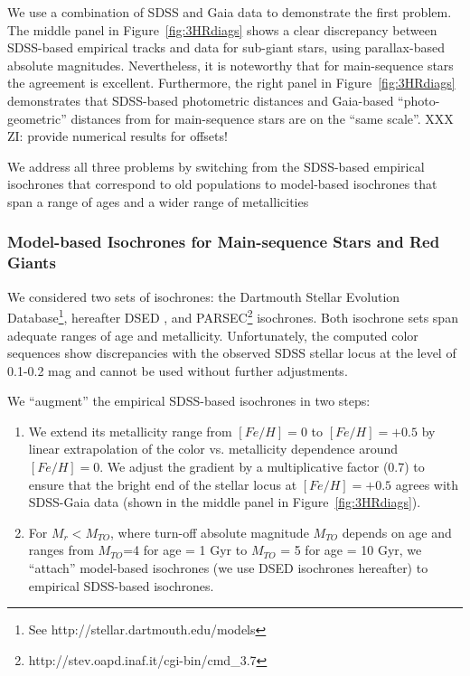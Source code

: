 We use a combination of SDSS and Gaia data to demonstrate the first problem. The middle panel in Figure~\ref{fig:3HRdiags} 
shows a clear discrepancy between SDSS-based empirical tracks and data for sub-giant stars, using parallax-based absolute
magnitudes. Nevertheless, it is noteworthy that
for main-sequence stars the agreement is excellent. Furthermore, the right panel in Figure~\ref{fig:3HRdiags} demonstrates
that SDSS-based photometric distances and Gaia-based ``photo-geometric'' distances from \cite{bailer-jones_estimating_2021}
for main-sequence stars are on the ``same scale''.  XXX ZI: provide numerical results for offsets! 
 
We address all three problems by switching from the SDSS-based empirical isochrones that correspond to old
populations to model-based isochrones that span a range of ages and a wider range of metallicities  
 

\subsubsection{Model-based Isochrones for Main-sequence Stars and Red Giants}
 

We considered two sets of isochrones: the Dartmouth Stellar Evolution Database\footnote{See http://stellar.dartmouth.edu/models},
hereafter DSED \citep{2008ApJS..178...89D}, and PARSEC\footnote{http://stev.oapd.inaf.it/cgi-bin/cmd\_3.7} \citep{2012MNRAS.427..127B} isochrones. 
Both isochrone sets span adequate ranges of age and metallicity. Unfortunately, the computed color sequences show discrepancies
with the observed SDSS stellar locus at the level of 0.1-0.2 mag and cannot be used without further adjustments.

We ``augment'' the empirical SDSS-based isochrones in two steps:
\begin{enumerate}
\item We extend its metallicity range from $[Fe/H]=0$ to $[Fe/H]=+0.5$ by linear extrapolation of the color vs. metallicity
  dependence around $[Fe/H]=0$. We adjust the gradient by a multiplicative factor (0.7) to ensure that the bright end of the
  stellar locus at $[Fe/H]=+0.5$ agrees with SDSS-Gaia data (shown in the middle panel in Figure~\ref{fig:3HRdiags}).
\item 
  For $M_r < M_{TO}$, where turn-off absolute magnitude $M_{TO}$ depends on age and ranges from $M_{TO}$=4 for age = 1 Gyr
  to $M_{TO}$ = 5 for age = 10 Gyr, we ``attach'' model-based isochrones (we use DSED isochrones hereafter) to empirical
  SDSS-based isochrones.
\end{enumerate}

